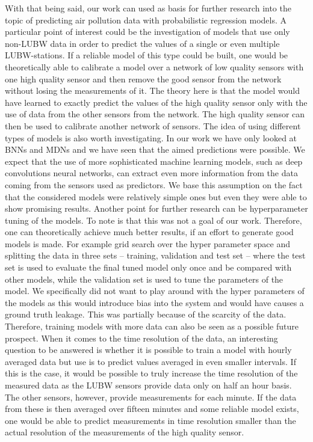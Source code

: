 \documentclass[12pt,a4paper,twoside]{scrartcl}
\numberwithin{equation}{section}
\begin{document}
With that being said, our work can used as basis for further research into the topic of predicting air pollution data with probabilistic regression models. A particular point of interest could be the investigation of models that use only non-LUBW data in order to predict the values of a single or even multiple LUBW-stations. If a reliable model of this type could be built, one would be theoretically able to calibrate a model over a network of low quality sensors with one high quality sensor and then remove the good sensor from the network without losing the measurements of it. The theory here is that the model would have learned to exactly predict the values of the high quality sensor only with the use of data from the other sensors from the network. The high quality sensor can then be used to calibrate another network of sensors. The idea of using different types of models is also worth investigating. In our work we have only looked at BNNs and MDNs and we have seen that the aimed predictions were possible. We expect that the use of more sophisticated machine learning models, such as deep convolutions neural networks, can extract even more information from the data coming from the sensors used as predictors. We base this assumption on the fact that the considered models were relatively simple ones but even they were able to show promising results. Another point for further research can be hyperparameter tuning of the models. To note is that this was not a goal of our work. Therefore, one can theoretically achieve much better results, if an effort to generate good models is made. For example grid search over the hyper parameter space and splitting the data in three sets -- training, validation and test set -- where the test set is used to evaluate the final tuned model only once and be compared with other models, while the validation set is used to tune the parameters of the model. We specifically did not want to play around with the hyper parameters of the models as this would introduce bias into the system and would have causes a ground truth leakage. This was partially because of the scarcity of the data. Therefore, training models with more data can also be seen as a possible future prospect. When it comes to the time resolution of the data, an interesting question to be answered is whether it is possible to train a model with hourly averaged data but use is to predict values averaged in even smaller intervals. If this is the case, it would be possible to truly increase the time resolution of the measured data as the LUBW sensors provide data only on half an hour basis. The other sensors, however, provide measurements for each minute. If the data from these is then averaged over fifteen minutes and some reliable model exists, one would be able to predict measurements in time resolution smaller than the actual resolution of the measurements of the high quality sensor.
\end{document}
